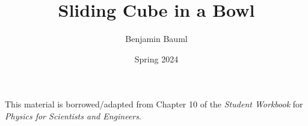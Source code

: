 \documentclass[]{article}
\title{Sliding Cube in a Bowl}
\author{Benjamin Bauml}
\date{Spring 2024}
\newcommand{\FileDepth}{../..}
\begin{document}
\maketitle
\begin{center}
	This material is borrowed/adapted from Chapter 10 of the \textit{Student Workbook} for \textit{Physics for Scientists and Engineers}.
\end{center}


\end{document}
